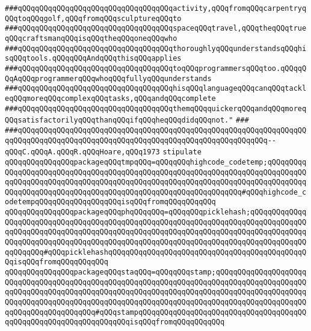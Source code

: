 \verb|###qQQqqQQqqQQqqQQqqQQqqQQqqQQqqQQqqQQqactivity,qQQqfromqQQqcarpentryqQQqtoqQQqgolf,qQQqfromqQQqsculptureqQQqto|\newline
\verb|###qQQqqQQqqQQqqQQqqQQqqQQqqQQqqQQqqQQqspaceqQQqtravel,qQQqtheqQQqtrueqQQqcraftsmanqQQqisqQQqtheqQQqoneqQQqwho|\newline
\verb|###qQQqqQQqqQQqqQQqqQQqqQQqqQQqqQQqqQQqthoroughlyqQQqunderstandsqQQqhisqQQqtools.qQQqqQQqAndqQQqthisqQQqapplies|\newline
\verb|###qQQqqQQqqQQqqQQqqQQqqQQqqQQqqQQqqQQqtoqQQqprogrammersqQQqtoo.qQQqqQQqAqQQqprogrammerqQQqwhoqQQqfullyqQQqunderstands|\newline
\verb|###qQQqqQQqqQQqqQQqqQQqqQQqqQQqqQQqqQQqhisqQQqlanguageqQQqcanqQQqtackleqQQqmoreqQQqcomplexqQQqtasks,qQQqandqQQqcomplete|\newline
\verb|###qQQqqQQqqQQqqQQqqQQqqQQqqQQqqQQqqQQqthemqQQqquickerqQQqandqQQqmoreqQQqsatisfactorilyqQQqthanqQQqifqQQqheqQQqdidqQQqnot."|\newline
\verb|###|\newline
\verb|###qQQqqQQqqQQqqQQqqQQqqQQqqQQqqQQqqQQqqQQqqQQqqQQqqQQqqQQqqQQqqQQqqQQqqQQqqQQqqQQqqQQqqQQqqQQqqQQqqQQqqQQqqQQqqQQqqQQqqQQqqQQqqQQq--qQQqC.qQQqA.qQQqR.qQQqHoare,qQQq1973|\newline
\newline
\newline
\newline
\verb|stipulate|\newline
\verb|qQQqqQQqqQQqqQQqpackageqQQqtmpqQQq=qQQqqQQqhighcode_codetemp;qQQqqQQqqQQqqQQqqQQqqQQqqQQqqQQqqQQqqQQqqQQqqQQqqQQqqQQqqQQqqQQqqQQqqQQqqQQqqQQqqQQqqQQqqQQqqQQqqQQqqQQqqQQqqQQqqQQqqQQqqQQqqQQqqQQqqQQqqQQqqQQqqQQqqQQqqQQqqQQqqQQqqQQqqQQqqQQqqQQqqQQqqQQqqQQqqQQqqQQqqQQq#qQQqhighcode_codetempqQQqqQQqqQQqqQQqqQQqisqQQqfromqQQqqQQqqQQq|\newline
\verb|qQQqqQQqqQQqqQQqpackageqQQqphqQQqqQQq=qQQqqQQqpicklehash;qQQqqQQqqQQqqQQqqQQqqQQqqQQqqQQqqQQqqQQqqQQqqQQqqQQqqQQqqQQqqQQqqQQqqQQqqQQqqQQqqQQqqQQqqQQqqQQqqQQqqQQqqQQqqQQqqQQqqQQqqQQqqQQqqQQqqQQqqQQqqQQqqQQqqQQqqQQqqQQqqQQqqQQqqQQqqQQqqQQqqQQqqQQqqQQqqQQqqQQqqQQqqQQqqQQqqQQqqQQqqQQqqQQqqQQq#qQQqpicklehashqQQqqQQqqQQqqQQqqQQqqQQqqQQqqQQqqQQqqQQqqQQqqQQqisqQQqfromqQQqqQQqqQQq|\newline
\verb|qQQqqQQqqQQqqQQqpackageqQQqstaqQQq=qQQqqQQqstamp;qQQqqQQqqQQqqQQqqQQqqQQqqQQqqQQqqQQqqQQqqQQqqQQqqQQqqQQqqQQqqQQqqQQqqQQqqQQqqQQqqQQqqQQqqQQqqQQqqQQqqQQqqQQqqQQqqQQqqQQqqQQqqQQqqQQqqQQqqQQqqQQqqQQqqQQqqQQqqQQqqQQqqQQqqQQqqQQqqQQqqQQqqQQqqQQqqQQqqQQqqQQqqQQqqQQqqQQqqQQqqQQqqQQqqQQqqQQqqQQqqQQqqQQqqQQq#qQQqstampqQQqqQQqqQQqqQQqqQQqqQQqqQQqqQQqqQQqqQQqqQQqqQQqqQQqqQQqqQQqqQQqqQQqisqQQqfromqQQqqQQqqQQq|\newline
